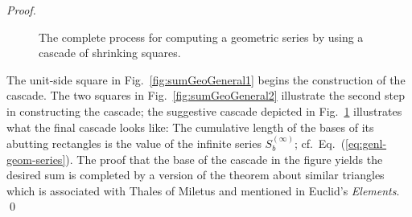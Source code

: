\begin{proof}
\begin{figure}[ht]
\begin{center}
\caption{The complete process for computing a geometric series by using a cascade of shrinking squares.}
       \label{fig:sumGeoGeneral3}
\end{center}
\end{figure}
The unit-side square in Fig.~\ref{fig:sumGeoGeneral1} begins the construction of the cascade.  The two squares in Fig.~\ref{fig:sumGeoGeneral2} illustrate the second step in constructing the cascade; the suggestive cascade depicted in Fig.~\ref{fig:sumGeoGeneral3} illustrates what the final cascade looks like: The cumulative length of the bases of its abutting rectangles is the value of the infinite series $S_b^{(\infty)}$; cf.~Eq.~(\ref{eq:genl-geom-series}).  The proof that the base of the cascade in the figure yields the desired sum is completed by a version of the theorem about similar triangles which is associated with Thales of Miletus and mentioned in Euclid's {\it Elements}. \qed
\end{proof}
 

\medskip

\noindent {}

